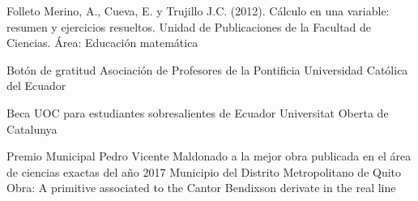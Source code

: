 \documentclass[
	a4paper,
	maincolor=cvblue!70!blue,
	sidecolor=gray!30,
	sectioncolor=cvblue!70!blue,
    sidebarwidth=7.5cm,
	topbottommargin=20pt,
	leftrightmargin=20pt,
]{fortysecondscv}
\begin{document}
    {Folleto}
    {Merino, A., Cueva, E. y Trujillo J.C. (2012). Cálculo en una variable: resumen y ejercicios resueltos. Unidad de Publicaciones de la Facultad de Ciencias.}
    {}
    {Área: Educación matemática}
    


    {Botón de gratitud}
    {Asociación de Profesores de la Pontificia Universidad Católica del Ecuador}
    {}

    {Beca UOC para estudiantes sobresalientes de Ecuador}
    {Universitat Oberta de Catalunya}
    {}
    
    {Premio Municipal Pedro Vicente Maldonado a la mejor obra publicada en el área de ciencias exactas del año 2017}
    {Municipio del Distrito Metropolitano de Quito}
    {Obra: A primitive associated to the Cantor Bendixson derivate in the real line}
    

\end{document}
